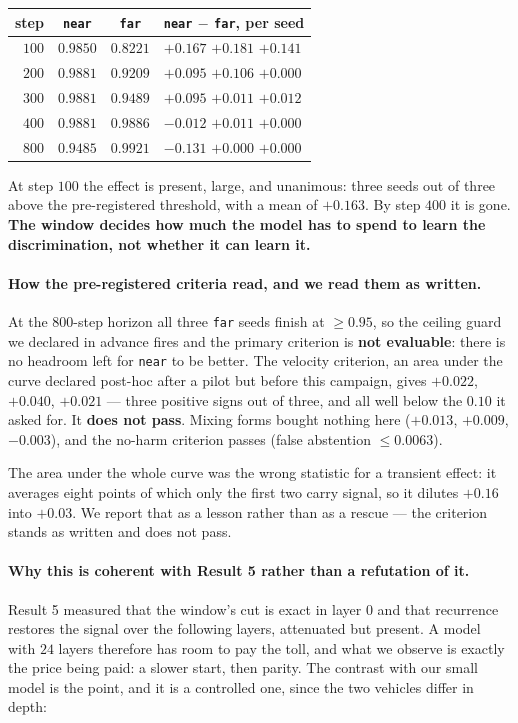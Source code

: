 \documentclass[10pt]{article}
\begin{document}
\begin{center}
\begin{tabular}{rccl}
\toprule
step & \texttt{near} & \texttt{far} & \texttt{near} $-$ \texttt{far}, per seed \\
\midrule
$100$ & $0.9850$ & $0.8221$ & $\mathbf{+0.167}$ \quad $\mathbf{+0.181}$ \quad $\mathbf{+0.141}$ \\
$200$ & $0.9881$ & $0.9209$ & $+0.095$ \quad $+0.106$ \quad $+0.000$ \\
$300$ & $0.9881$ & $0.9489$ & $+0.095$ \quad $+0.011$ \quad $+0.012$ \\
$400$ & $0.9881$ & $0.9886$ & $-0.012$ \quad $+0.011$ \quad $+0.000$ \\
$800$ & $0.9485$ & $0.9921$ & $-0.131$ \quad $+0.000$ \quad $+0.000$ \\
\bottomrule
\end{tabular}
\end{center}

At step $100$ the effect is present, large, and unanimous: three seeds out of three above the
pre-registered threshold, with a mean of $+0.163$. By step $400$ it is gone. \textbf{The window
decides how much the model has to spend to learn the discrimination, not whether it can learn it.}

\paragraph{How the pre-registered criteria read, and we read them as written.} At the $800$-step
horizon all three \texttt{far} seeds finish at $\ge 0.95$, so the ceiling guard we declared in advance
fires and the primary criterion is \textbf{not evaluable}: there is no headroom left for \texttt{near}
to be better. The velocity criterion, an area under the curve declared post-hoc after a pilot but
before this campaign, gives $+0.022$, $+0.040$, $+0.021$ --- three positive signs out of three, and
all well below the $0.10$ it asked for. It \textbf{does not pass}. Mixing forms bought nothing here
($+0.013$, $+0.009$, $-0.003$), and the no-harm criterion passes (false abstention $\le 0.0063$).

The area under the whole curve was the wrong statistic for a transient effect: it averages eight
points of which only the first two carry signal, so it dilutes $+0.16$ into $+0.03$. We report that as
a lesson rather than as a rescue --- the criterion stands as written and does not pass.

\paragraph{Why this is coherent with Result 5 rather than a refutation of it.} Result 5 measured that
the window's cut is exact in layer $0$ and that recurrence restores the signal over the following
layers, attenuated but present. A model with $24$ layers therefore has room to pay the toll, and what
we observe is exactly the price being paid: a slower start, then parity. The contrast with our small
model is the point, and it is a controlled one, since the two vehicles differ in depth:
\end{document}
